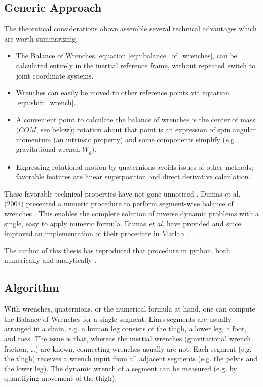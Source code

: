 \documentclass[10pt,a4paper]{article}
\begin{document}
\subsection{Generic Approach}
\label{sec:org7b95ef9}
The theoretical considerations above assemble several technical advantages which are worth summarizing.
\begin{itemize}
\item The Balance of Wrenches, equation \eqref{eqn:balance_of_wrenches}, can be calculated entirely in the inertial reference frame, without repeated switch to joint coordinate systems.
\item Wrenches can easily be moved to other reference points via equation \eqref{eqn:shift_wrench}.
\item A convenient point to calculate the balance of wrenches is the center of mass (\(COM\), see below); rotation about that point is an expression of spin angular momentum (an intrinsic property) and some components simplify (e.g. gravitational wrench \(W_{g}\)).
\item Expressing rotational motion by quaternions avoids issues of other methods; favorable features are linear superposition and direct derivative calculation.
\end{itemize}

These favorable technical properties have not gone unnoticed \citep{Dumas2004,Dumas2007}.
Dumas et al. (2004) presented a numeric procedure to perform segment-wise balance of wrenches \citep[equation 15 in][]{Dumas2004}.
This enables the complete solution of inverse dynamic problems with a single, easy to apply numeric formula.
Dumas \emph{et al.} have provided and since improved an implementation of their procedure in Matlab \citep{DumasMatlab}.


The author of this thesis has reproduced that procedure in python, both numerically and analytically \citep{Mielke2021id}.


\subsection{Algorithm}
\label{sec:orgd797032}
With wrenches, quaternions, or the numerical formula at hand, one can compute the Balance of Wrenches for a single segment.
Limb segments are usually arranged in a chain, e.g. a human leg consists of the thigh, a lower leg, a foot, and toes.
The issue is that, whereas the inertial wrenches (gravitational wrench, friction, \ldots{}) are known, connecting wrenches usually are not.
Each segment (e.g. the thigh) receives a wrench input from all adjacent segments (e.g. the pelvis and the lower leg).
The dynamic wrench of a segment can be measured (e.g. by quantifying movement of the thigh).
\end{document}
